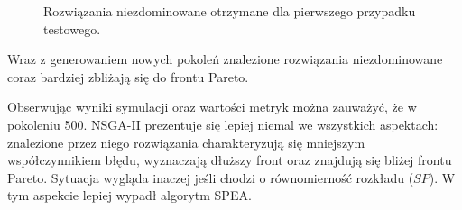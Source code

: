 \documentclass[twoside]{iisthesis}
\begin{document}
\begin{figure}\centering
{}
    \hfill
{}
    \hfill
{}
\caption{Rozwiązania niezdominowane otrzymane dla pierwszego przypadku testowego.}
    \label{fig:small_front}
\end{figure}
Wraz z generowaniem nowych pokoleń znalezione rozwiązania niezdominowane coraz bardziej zbliżają się do frontu Pareto.

Obserwując wyniki symulacji oraz wartości metryk można zauważyć, że w pokoleniu 500. NSGA-II prezentuje się lepiej niemal we wszystkich aspektach: znalezione przez niego rozwiązania charakteryzują się mniejszym współczynnikiem błędu, wyznaczają dłuższy front oraz znajdują się bliżej frontu Pareto. Sytuacja wygląda inaczej jeśli chodzi o równomierność rozkładu ($SP$). W tym aspekcie lepiej wypadł algorytm SPEA.
\end{document}
